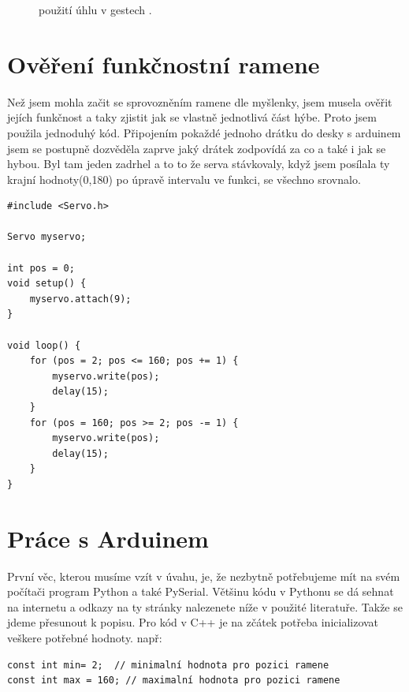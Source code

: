\documentclass[12pt, a4paper,
twoside,        %
openright
]{report}
\begin{document}
{\begin{figure}[h]
	
	\caption{použití úhlu v gestech \cite{uhly v gestech}.} %
	\label{fig:vzdalenost} %
\end{figure}



\newpage

\section{Ověření funkčnostní ramene}
Než jsem mohla začit se sprovozněním ramene dle myšlenky, jsem musela ověřit jejích funkčnost a taky zjistit jak se vlastně jednotlivá část hýbe.
Proto jsem použila jednoduhý kód. Připojením pokaždé jednoho drátku do desky s arduinem jsem se postupně dozvěděla zaprve jaký drátek zodpovídá za co a také i jak se hybou. Byl tam jeden zadrhel a to to že serva stávkovaly, když jsem posílala ty krajní hodnoty(0,180) po úpravě intervalu ve funkci, se všechno srovnalo.

\begin{lstlisting}[style=Python, caption={Ukázka kódu k ověření funkčnosti}]
#include <Servo.h>

Servo myservo;  

int pos = 0;    
void setup() {
	myservo.attach(9);  
}

void loop() {
	for (pos = 2; pos <= 160; pos += 1) { 
		myservo.write(pos);             
		delay(15);                      
	}
	for (pos = 160; pos >= 2; pos -= 1) {
		myservo.write(pos);            
		delay(15);                       
	}
}
\end{lstlisting}

\newpage

\section{Práce s Arduinem}

První věc, kterou musíme vzít v úvahu, je, že nezbytně potřebujeme mít na svém počítači program Python a také PySerial. Většinu kódu v Pythonu se dá sehnat na internetu a odkazy na ty stránky nalezenete níže v použité literatuře. 
Takže se jdeme přesunout k popisu.
Pro kód v C++ je na zčátek potřeba inicializovat veškere potřebné hodnoty.
např:

\begin{lstlisting}[style=Python, caption={Inicializace potřebných hodnot}]
const int min= 2;  // minimalní hodnota pro pozici ramene
const int max = 160; // maximalní hodnota pro pozici ramene


\end{lstlisting}}
\end{document}
